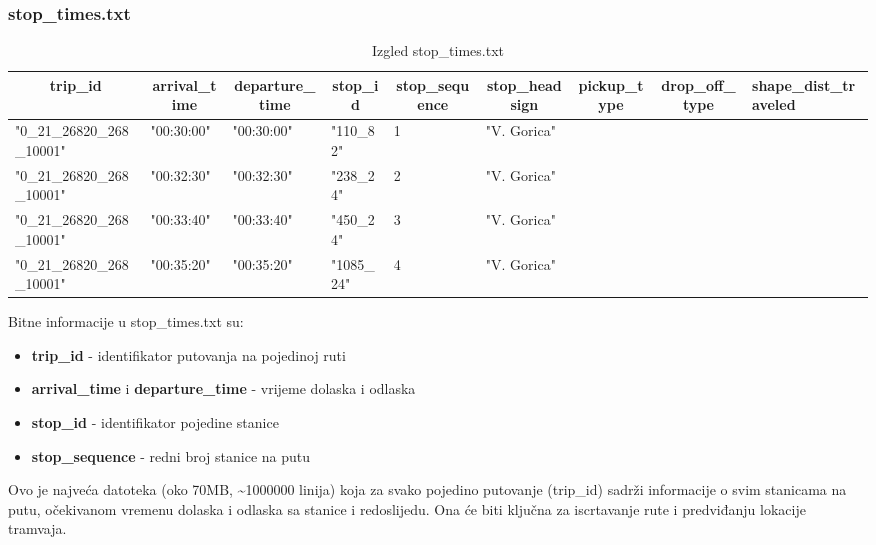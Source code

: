 \documentclass[zavrsnirad]{fer}
\begin{document}
\subsubsection{stop\_times.txt}

\begin{table}[htb]
	\begin{adjustbox}{width=\columnwidth,center}
		\begin{tabular}{l|l|l|l|l|l|l|l|l}
			\hline
			\multicolumn{1}{c|}{\textbf{trip\_id}} & \multicolumn{1}{c|}{\textbf{arrival\_time}} & \multicolumn{1}{c|}{\textbf{departure\_time}} & \multicolumn{1}{c|}{\textbf{stop\_id}} & \multicolumn{1}{c|}{\textbf{stop\_sequence}} & \multicolumn{1}{c|}{\textbf{stop\_headsign}} & \multicolumn{1}{c|}{\textbf{pickup\_type}} & \multicolumn{1}{c|}{\textbf{drop\_off\_type}} & \textbf{shape\_dist\_traveled} \\ \hline
			"0\_21\_26820\_268\_10001" & "00:30:00" & "00:30:00" & "110\_82" & 1 & "V. Gorica" &  &  &  \\ \hline
			"0\_21\_26820\_268\_10001" & "00:32:30" & "00:32:30" & "238\_24" & 2 & "V. Gorica" &  &  &  \\ \hline
			"0\_21\_26820\_268\_10001" & "00:33:40" & "00:33:40" & "450\_24" & 3 & "V. Gorica" &  &  &  \\ \hline
			"0\_21\_26820\_268\_10001" & "00:35:20" & "00:35:20" & "1085\_24" & 4 & "V. Gorica" &  &  &  \\ \hline
		\end{tabular}
	\end{adjustbox}
	\caption{Izgled stop\_times.txt}
	\label{tbl:stop_times}
\end{table}

Bitne informacije u stop\_times.txt su:
\begin{itemize}
	\item \textbf{trip\_id} - identifikator putovanja na pojedinoj ruti
	\item \textbf{arrival\_time} i \textbf{departure\_time} - vrijeme dolaska i odlaska
	\item \textbf{stop\_id} - identifikator pojedine stanice
	\item \textbf{stop\_sequence} - redni broj stanice na putu
\end{itemize}
Ovo je najveća datoteka (oko 70MB, \textasciitilde{}1000000 linija) koja za svako pojedino putovanje (trip\_id) sadrži informacije o svim stanicama na putu, očekivanom vremenu dolaska i odlaska sa stanice i redoslijedu. Ona će biti ključna za iscrtavanje rute i predviđanju lokacije tramvaja.
\end{document}
